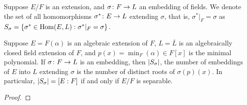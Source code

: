 \begin{definition}
    Suppose \(E/F\) is an extension,
    and \(\sigma\colon F\to L\) an embedding of fields.
    We denote the set of all homomorphisms \(\sigma^\ast\colon E\to L\)
    extending \(\sigma\), that is, \(\sigma^\ast\vert_F = \sigma\) as
    \(S_\sigma = \{\sigma^\ast\in\operatorname{Hom}(E,L) : \sigma^\ast\vert_F = \sigma\}\).
\end{definition}
\begin{theorem}\label{thm:simple-extension-hom-count}
    Suppose \(E = F(\alpha)\) is an algebraic extension of \(F\),
    \(L = \overline{L}\) is an algebraically closed field extension of \(F\),
    and \(p(x) = \min_F(\alpha) \in F[x]\) is the minimal polynomial.
    If \(\sigma\colon F\to L\) is an embedding,
    then \(\abs{S_\sigma}\),
    the number of embeddings of \(E\) into \(L\) extending \(\sigma\)
    is the number of distinct roots of \(\sigma(p)(x)\).
    In particular, \(\abs{S_\sigma} = [E:F]\)
    if and only if \(E/F\) is separable.
\end{theorem}
\begin{proof}
\end{proof}

